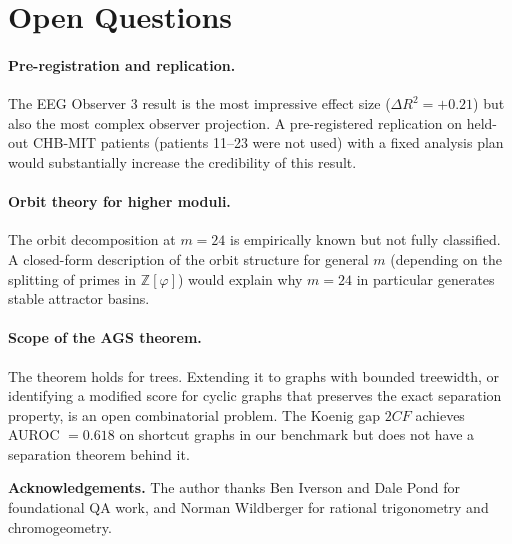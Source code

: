 \documentclass[11pt]{article}
\begin{document}
\section{Open Questions}\label{sec:open}

\paragraph{Pre-registration and replication.}
The EEG Observer 3 result is the most impressive effect size ($\Delta R^2 = +0.21$)
but also the most complex observer projection.  A pre-registered replication
on held-out CHB-MIT patients (patients 11--23 were not used) with a fixed
analysis plan would substantially increase the credibility of this result.

\paragraph{Orbit theory for higher moduli.}
The orbit decomposition at $m=24$ is empirically known but not fully classified.
A closed-form description of the orbit structure for general $m$ (depending on
the splitting of primes in $\mathbb{Z}[\varphi]$) would explain why $m=24$
in particular generates stable attractor basins.

\paragraph{Scope of the AGS theorem.}
The theorem holds for trees.  Extending it to graphs with bounded treewidth,
or identifying a modified score for cyclic graphs that preserves the
exact separation property, is an open combinatorial problem.
The Koenig gap $2CF$ achieves AUROC $= 0.618$ on shortcut graphs in our benchmark
but does not have a separation theorem behind it.

\bigskip
\noindent\textbf{Acknowledgements.}
The author thanks Ben Iverson and Dale Pond for foundational QA work,
and Norman Wildberger for rational trigonometry and chromogeometry.
\end{document}
